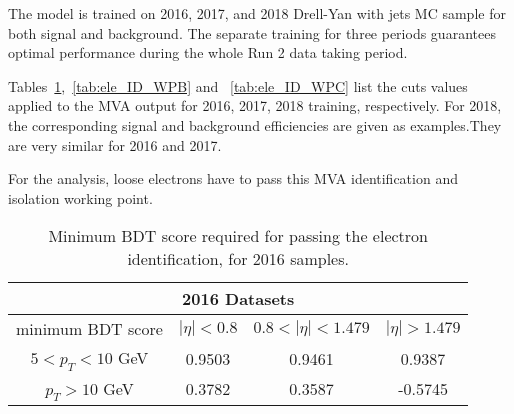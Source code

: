 The model is trained on 2016, 2017, and 2018 Drell-Yan with jets MC sample for both signal and background. The separate training for three periods guarantees
optimal performance during the whole Run 2 data taking period.


Tables~\ref{tab:ele_ID_WPA},~\ref{tab:ele_ID_WPB} and ~\ref{tab:ele_ID_WPC} list the cuts values applied to the MVA output for 2016, 2017, 2018 training, respectively. For 2018, the corresponding signal and background efficiencies are given as examples.They are very similar for 2016 and 2017.

For the analysis, loose electrons have to pass this MVA identification and isolation working point.

\begin{table}[ht]
    \centering
    \begin{tabular}{c|c c c}
\hline
\multicolumn{4}{|c|}{2016 Datasets}                                                                 \\
\hline %
minimum BDT score    &  $|\eta| < 0.8 $ & $0.8 < |\eta| < 1.479$ 	& $|\eta| > 1.479$      \\
\hline %
$ 5 < p_T < 10 $ GeV &  0.9503      & 0.9461  	& 0.9387		\\
$p_T > 10$ GeV         &  0.3782	& 0.3587		&  -0.5745	\\
\hline %
\hline %
     \end{tabular}
\small
    \caption{Minimum BDT score required for passing the electron identification, for 2016 samples.}%
    \label{tab:ele_ID_WPA}
\end{table}

